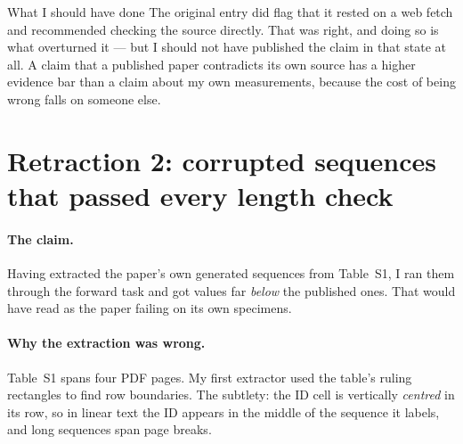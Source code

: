 \begin{warnbox}{What I should have done}
The original entry did flag that it rested on a web fetch and recommended
checking the source directly. That was right, and doing so is what overturned
it --- but I should not have published the claim in that state at all. A claim
that a published paper contradicts its own source has a higher evidence bar than
a claim about my own measurements, because the cost of being wrong falls on
someone else.
\end{warnbox}

\section{Retraction 2: corrupted sequences that passed every length check}
\label{sec:tables1}

\paragraph{The claim.} Having extracted the paper's own generated sequences
from Table~S1, I ran them through the forward task and got \Rsq{} values far
\emph{below} the published ones. That would have read as the paper failing on
its own specimens.

\paragraph{Why the extraction was wrong.} Table~S1 spans four PDF pages. My
first extractor used the table's ruling rectangles to find row boundaries. The
subtlety: the ID cell is vertically \emph{centred} in its row, so in linear text
the ID appears in the middle of the sequence it labels, and long sequences span
page breaks.

